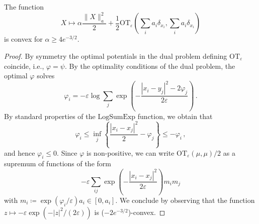 \documentclass[10pt,a4paper]{amsart}
\let\mr=\mathrm
\begin{document}
\begin{lemma}\label{lem:convdebias}
The function
\[
X \mapsto \alpha \frac{\|X\|^2_a}{2} + \frac{1}{2}\mr{OT}_\varepsilon\left( \sum_i a_i \delta_{x_i},\sum_i a_i \delta_{x_i}\right)
\]
is convex for $\alpha\geq 4 e^{-3/2}$.
\end{lemma}

\begin{proof}
By symmetry the optimal potentials in the dual problem defining $\mr{OT}_\varepsilon$ coincide, i.e., $\varphi=\psi$. By the optimality conditions of the dual problem, the optimal $\varphi$ solves 
\[
{\varphi_i} = -\varepsilon \log\sum_j \exp\left( -\frac{|x_i-y_j|^2 -2\varphi_j}{2\varepsilon} \right)\,.
\]
By standard properties of the $\mr{LogSumExp}$ function, we obtain that 
\[
{\varphi_i} \leq \inf_j \left\{\frac{|x_i-x_j|^2 }{2}- \varphi_j \right\} \leq -{\varphi_i}\,,
\]
and hence $\varphi_i\leq 0$. Since $\varphi$ is non-positive, we can write $\mr{OT}_\varepsilon(\mu,\mu)/2$ as a supremum of functions of the form
\[
- \varepsilon \sum_{ij} \exp\left( - \frac{|x_i -x_j|^2}{2\varepsilon} \right) m_im_j  
\]
with $m_i \coloneqq \exp(\varphi_i/\varepsilon)a_i \in[0,a_i]$. We conclude by observing that the function $z\mapsto -\varepsilon \exp(-|z|^2/(2\varepsilon))$ is ($-2e^{-3/2}$)-convex.
\end{proof}
\end{document}

